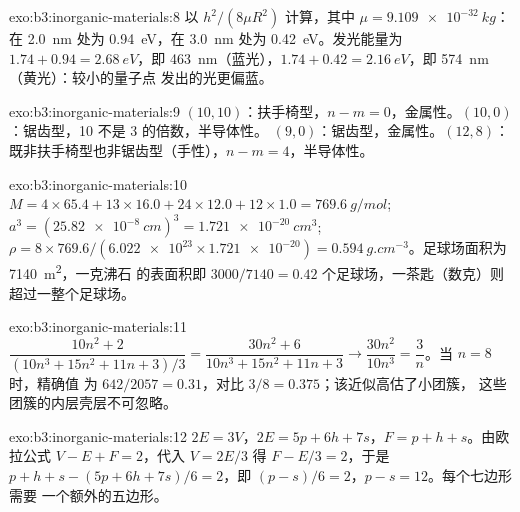 \begin{solution}{exo:b3:inorganic-materials:8}
以 $h^2/(8\mu R^2)$ 计算，其中 $\mu = \qty{9.109e-32}{kg}$：在 \qty{2.0}{nm} 处为 \qty{0.94}{eV}，在 \qty{3.0}{nm} 处为 \qty{0.42}{eV}。发光能量为
$1.74 + 0.94 = \qty{2.68}{eV}$，即 \qty{463}{nm}（蓝光），$1.74 + 0.42 = \qty{2.16}{eV}$，即 \qty{574}{nm}（黄光）：较小的量子点
发出的光更偏蓝。
\end{solution}

\begin{solution}{exo:b3:inorganic-materials:9}
$(10, 10)$：扶手椅型，$n - m = 0$，金属性。$(10, 0)$：锯齿型，10 不是 3 的倍数，半导体性。
$(9, 0)$：锯齿型，金属性。$(12, 8)$：既非扶手椅型也非锯齿型（手性），$n - m = 4$，半导体性。
\end{solution}

\begin{solution}{exo:b3:inorganic-materials:10}
$M = 4 \times 65.4 + 13 \times 16.0 + 24 \times 12.0 + 12 \times 1.0 = \qty{769.6}{g/mol}$; $a^3 = (\qty{25.82e-8}{cm})^3 = \qty{1.721e-20}{cm^3}$;
$\rho = 8 \times 769.6/(\num{6.022e23} \times \num{1.721e-20}) = \qty{0.594}{g.cm^{-3}}$。足球场面积为 \qty{7140}{m^2}，一克沸石
的表面积即 $3000/7140 = 0.42$ 个足球场，一茶匙（数克）则超过一整个足球场。
\end{solution}

\begin{solution}{exo:b3:inorganic-materials:11}
$\dfrac{10n^2 + 2}{(10n^3 + 15n^2 + 11n + 3)/3} = \dfrac{30n^2 + 6}{10n^3 + 15n^2 + 11n + 3} \to \dfrac{30n^2}{10n^3} = \dfrac3n$。当 $n = 8$ 时，精确值
为 $642/2057 = 0.31$，对比 $3/8 = 0.375$；该近似高估了小团簇，
这些团簇的内层壳层不可忽略。
\end{solution}

\begin{solution}{exo:b3:inorganic-materials:12}
$2E = 3V$，$2E = 5p + 6h + 7s$，$F = p + h + s$。由欧拉公式 $V - E + F = 2$，代入 $V = 2E/3$ 得 $F - E/3 = 2$，于是
$p + h + s - (5p + 6h + 7s)/6 = 2$，即 $(p - s)/6 = 2$，$p - s = 12$。每个七边形需要
一个额外的五边形。
\end{solution}

